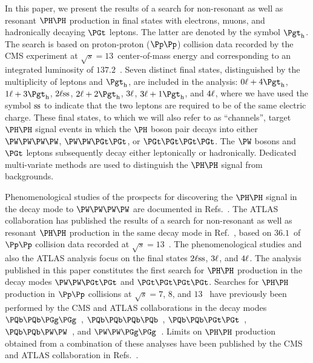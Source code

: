 In this paper, we present the results of a search for non-resonant as well as resonant $\HH$ production
in final states with electrons, muons, and hadronically decaying $\PGt$ leptons. The latter are denoted by the symbol $\tauh$.
The search is based on proton-proton ($\Pp\Pp$) collision data recorded by the CMS experiment at $\sqrt{s} = 13$~\TeV center-of-mass energy
and corresponding to an integrated luminosity of $137.2$~\fbinv.
Seven distinct final states, distinguished by the multiplicity of leptons and $\tauh$, are included in the analysis:
$0\Plepton + 4\tauh$, $1\Plepton + 3\tauh$, $2\Plepton\ss$, $2\Plepton + 2\tauh$, $3\Plepton$, $3\Plepton + 1\tauh$, and $4\Plepton$,
where we have used the symbol $\ss$ to indicate that the two leptons are required to be of the same electric charge. 
These final states, to which we will also refer to as ``channels'', 
target $\HH$ signal events in which the $\PHiggs$ boson pair decays into either $\PW\PW\PW\PW$, $\PW\PW\PGt\PGt$, or $\PGt\PGt\PGt\PGt$.
The $\PW$ bosons and $\PGt$ leptons subsequently decay either leptonically or hadronically.
Dedicated multi-variate methods are used to distinguish the $\PHiggs\PHiggs$ signal from backgrounds.

Phenomenological studies of the prospects for discovering the $\HH$ signal in the decay mode to $\PW\PW\PW\PW$ 
are documented in Refs.~\cite{Baur:2002rb,Baur:2002qd,Li:2015yia,Adhikary:2017jtu,Ren:2017jbg}.
The ATLAS collaboration has published the results of a search for non-resonant as well as resonant $\HH$ production in the same decay mode in Ref.~\cite{Aaboud:2018ksn},
based on $36.1$~\fbinv of $\Pp\Pp$ collision data recorded at $\sqrt{s} = 13$~\TeV.
The phenomenological studies and also the ATLAS analysis focus on the final states $2\Plepton\ss$, $3\Plepton$, and $4\Plepton$.
The analysis published in this paper constitutes the first search for $\HH$ production in the decay modes $\PW\PW\PGt\PGt$ and $\PGt\PGt\PGt\PGt$.
Searches for $\HH$ production in $\Pp\Pp$ collisions at $\sqrt{s} = 7$, $8$, and $13$~\TeV
have previously been performed by the CMS and ATLAS collaborations in the decay modes 
$\Pbottom\Pbottom\PGg\PGg$~\cite{Aad:2014yja,Khachatryan:2016sey,Sirunyan:2018iwt,Aaboud:2018ftw}, 
$\Pbottom\Pbottom\Pbottom\Pbottom$~\cite{Khachatryan:2015yea,Aad:2015uka,Aaboud:2018knk,Sirunyan:2018zkk,Sirunyan:2018tki}, 
$\Pbottom\Pbottom\PGt\PGt$~\cite{Aad:2015xja,Sirunyan:2017tqo,Sirunyan:2017djm,Aaboud:2018sfw}, 
$\Pbottom\Pbottom\PW\PW$~\cite{Sirunyan:2017guj}, 
and $\PW\PW\PGg\PGg$~\cite{Aaboud:2018ewm}.
Limits on $\HH$ production obtained from a combination of these analyses have been published by the CMS and ATLAS collaboration 
in Refs.~\cite{Aad:2015xja,Sirunyan:2017tqo,Sirunyan:2018ayu}.

